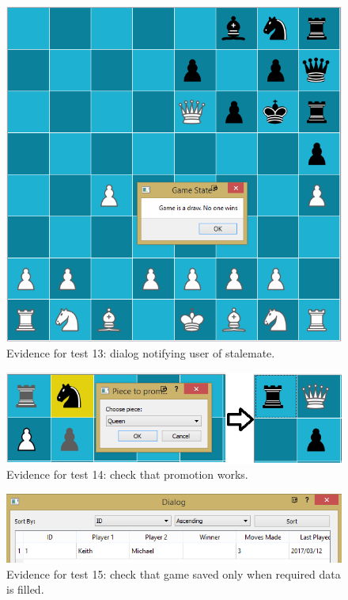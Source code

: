 \documentclass[twoside, 12pt]{report}
\begin{document}
\begin{figure}[H]
	\centering
	\includegraphics[width=1.0\textwidth]{images/screenshots/test-13}
	\caption{Evidence for test 13: dialog notifying user of stalemate.}
	\label{test-13}
\end{figure}
\begin{figure}[H]
	\centering
	\includegraphics[width=1.0\textwidth]{images/screenshots/test-14}
	\caption{Evidence for test 14: check that promotion works.}
	\label{test-14}
\end{figure}
\begin{figure}[H]
	\centering
	\includegraphics[width=1.0\textwidth]{images/screenshots/test-15}
	\caption{Evidence for test 15: check that game saved only when required data is filled.}
	\label{test-15}
\end{figure}
\end{document}
